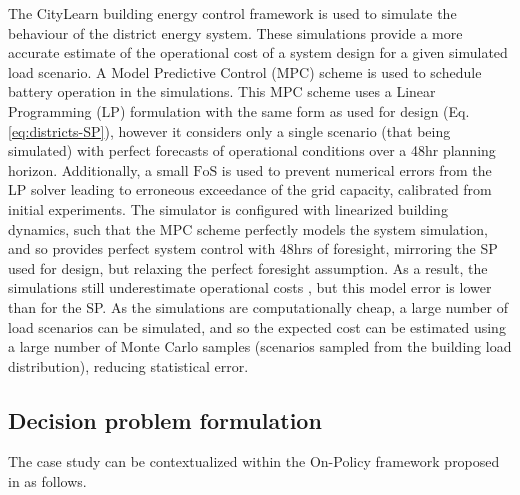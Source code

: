 The CityLearn \citep{vazquez-canteli2019CityLearnV1OpenAI,vazquez-canteli2020CityLearnStandardizingResearch} building energy control framework is used to simulate the behaviour of the district energy system. These simulations provide a more accurate estimate of the operational cost of a system design for a given simulated load scenario. A Model Predictive Control (MPC) scheme is used to schedule battery operation in the simulations. This MPC scheme uses a Linear Programming (LP) formulation with the same form as used for design (Eq. \ref{eq:districts-SP}), however it considers only a single scenario (that being simulated) with perfect forecasts of operational conditions over a 48hr planning horizon. Additionally, a small $\text{FoS}$ is used to prevent numerical errors from the LP solver leading to erroneous exceedance of the grid capacity, calibrated from initial experiments. The simulator is configured with linearized building dynamics, such that the MPC scheme perfectly models the system simulation, and so provides perfect system control with 48hrs of foresight, mirroring the SP used for design, but relaxing the perfect foresight assumption.
As a result, the simulations still underestimate operational costs \citep{langtry2024ImpactDataForecasting}, but this model error is lower than for the SP. As the simulations are computationally cheap, a large number of load scenarios can be simulated, and so the expected cost can be estimated using a large number of Monte Carlo samples (scenarios sampled from the building load distribution), reducing statistical error.


\subsection{Decision problem formulation}


The case study can be contextualized within the On-Policy  framework proposed in  as follows.

